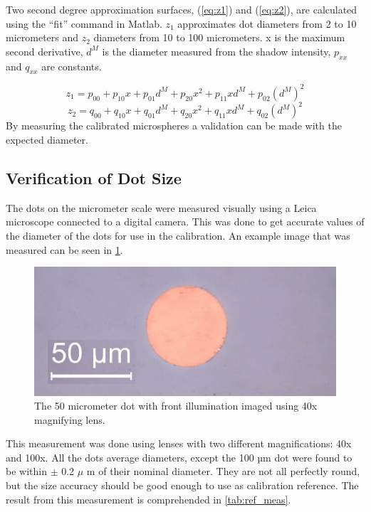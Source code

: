 Two second degree approximation surfaces, (\ref{eq:z1}) and (\ref{eq:z2}), are calculated using the “fit” command in Matlab. $z_1$ approximates dot diameters from 2 to 10 micrometers and $z_2$ diameters from 10 to 100 micrometers. x is the maximum second derivative, $d^M$ is the diameter measured from the shadow intensity, $p_{xx}$ and $q_{xx}$ are constants.

\begin{equation} \label{eq:z1}
z_1=p_{00}+p_{10} x+p_{01} d^M+p_{20} x^2+p_{11} xd^M+p_{02} {(d^M)}^2
\end{equation}
\begin{equation} \label{eq:z2}
z_2=q_{00}+q_{10} x+q_{01} d^M+q_{20} x^2+q_{11} xd^M+q_{02} {(d^M)}^2
\end{equation}
By measuring the calibrated microspheres a validation can be made with the expected diameter. 

\subsection{Verification of Dot Size}

The dots on the micrometer scale were measured visually using a Leica microscope connected to a digital camera. This was done to get accurate values of the diameter of the dots for use in the calibration. An example image that was measured can be seen in \cref{fig:50umdot40x}.

\begin{figure}[ht]
\centering\includegraphics[width=0.75\linewidth]{./figures/50umdot40x.jpg}
\caption{The 50 micrometer dot with front illumination imaged using 40x magnifying lens.}
\label{fig:50umdot40x}
\end{figure}

This measurement was done using lenses with two different magnifications: 40x and 100x. All the dots average diameters, except the 100 µm dot were found to be within $\pm$ 0.2 $\mu$ m of their nominal diameter. They are not all perfectly round, but the size accuracy should be good enough to use as calibration reference. The result from this measurement is comprehended in \cref{tab:ref_meas}.

